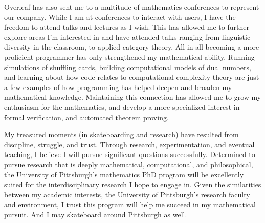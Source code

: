\documentclass[11pt]{article}
\begin{document}
Overleaf has also sent me to a multitude of mathematics conferences to represent our company. While I am at conferences to interact with users, I have the freedom to attend talks and lectures as I wish. This has allowed me to further explore areas I'm interested in and have attended talks ranging from linguistic diversity in the classroom, to applied category theory. All in all becoming a more proficient programmer has only strengthened my mathematical ability. Running simulations of shuffling cards, building computational models of dual numbers, and learning about how code relates to computational complexity theory are just a few examples of how programming has helped deepen and broaden my mathematical knowledge. Maintaining this connection has allowed me to grow my enthusiasm for the mathematics, and develop a more specialized interest in formal verification, and automated theorem proving.

My treasured moments (in skateboarding and research) have resulted from discipline, struggle, and trust. Through research, experimentation, and eventual teaching, I believe I will pursue significant questions successfully. Determined to pursue research that is deeply mathematical, computational, and philosophical, the University of Pittsburgh's mathematics PhD program will be excellently suited for the interdisciplinary research I hope to engage in. Given the similarities between my academic interests, the University of Pittsburgh’s research faculty and environment, I trust this program will help me succeed in my mathematical pursuit. And I may skateboard around Pittsburgh as well.
\end{document}
